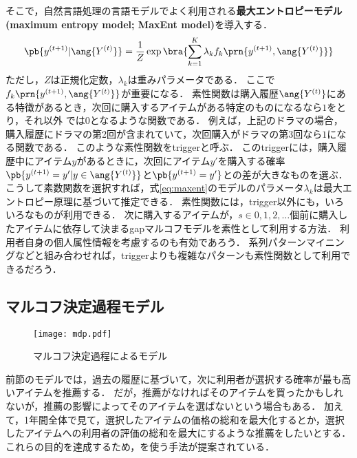 そこで，自然言語処理の言語モデルでよく利用される\textbf{最大エントロピーモデル (maximum entropy model; MaxEnt model)}を導入する．
\begin{equation}
\pb{y^{(t+1)}|\ang{Y^{(t)}}}=
\frac{1}{Z}
\exp\bra{\sum_{k=1}^K\lambda_k f_k\prn{y^{(t+1)},\ang{Y^{(t)}}}}
\label{eq:maxent}
\end{equation}
ただし，$Z$は正規化定数，$\lambda_k$は重みパラメータである．
ここで $f_k\prn{y^{(t+1)},\ang{Y^{(t)}}}$が重要になる．
素性関数は購入履歴$\ang{Y^{(t)}}$にある特徴があるとき，次回に購入するアイテムがある特定のものになるなら$1$をとり，それ以外
では$0$となるような関数である．
例えば，上記のドラマの場合，購入履歴にドラマの第2回が含まれていて，次回購入がドラマの第3回なら$1$になる関数である．
このような素性関数をtriggerと呼ぶ．
このtriggerには，購入履歴中にアイテム$y$があるときに，次回にアイテム$y'$を購入する確率
$\pb{y^{(t+1)}=y'|y\in \ang{Y^{(t)}}}$と$\pb{y^{(t+1)}=y'}$との差が大きなものを選ぶ．
こうして素数関数を選択すれば，式\eqref{eq:maxent}のモデルのパラメータ$\lambda_k$は最大エントロピー原理\cite{j:0020}に基づいて推定できる．
素性関数には，trigger以外にも，いろいろなものが利用できる．
次に購入するアイテムが，$s\in{0,1,2,\dotsc}$個前に購入したアイテムに依存して決まるgapマルコフモデルを素性として利用する方法\cite{trieice:07:01}．
利用者自身の個人属性情報を考慮するのも有効であろう．
系列パターンマイニング\cite{e:0012,icde:01:02}などと組み合わせれば，triggerよりも複雑なパターンも素性関数として利用できるだろう．

\subsection{マルコフ決定過程モデル}

\begin{figure}
\centering
\texttt{[image: mdp.pdf]}
\caption{マルコフ決定過程によるモデル}
\label{fig:mdpmodel}
\end{figure}

前節のモデルでは，過去の履歴に基づいて，次に利用者が選択する確率が最も高いアイテムを推薦する．
だが，推薦がなければそのアイテムを買ったかもしれないが，推薦の影響によってそのアイテムを選ばないという場合もある．
加えて，1年間全体で見て，選択したアイテムの価格の総和を最大化するとか，選択したアイテムへの利用者の評価の総和を最大にするような推薦をしたいとする．
これらの目的を達成するため，を使う手法が提案されている\cite{uai:02:02,jmlr:05:03}．

